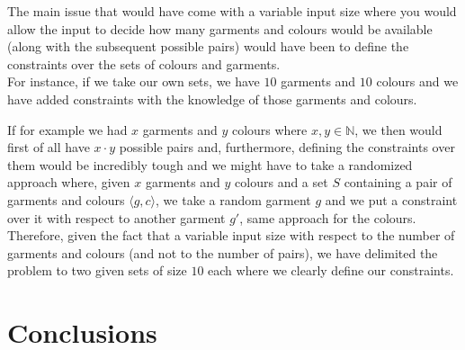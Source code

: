 \documentclass[12pt]{article}
\begin{document}
The main issue that would have come with a variable input size where you would allow the input to decide how many garments and colours would be available (along with the subsequent possible pairs) would have been to define the constraints over the sets of colours and garments.\\

For instance, if we take our own sets, we have $10$ garments and $10$ colours and we have added constraints with the knowledge of those garments and colours.

If for example we had $x$ garments and $y$ colours where $x, y \in \mathbb{N}$, we then would first of all have $x \cdot y$ possible pairs and, furthermore, defining the constraints over them would be incredibly tough and we might have to take a randomized approach where, given $x$ garments and $y$ colours and a set $S$ containing a pair of garments and colours $\langle g, c \rangle$, we take a random garment $g$ and we put a constraint over it with respect to another garment $g'$, same approach for the colours.\\

Therefore, given the fact that a variable input size with respect to the number of garments and colours (and not to the number of pairs), we have delimited the problem to two given sets of size $10$ each where we clearly define our constraints.

\section{Conclusions}
\end{document}
